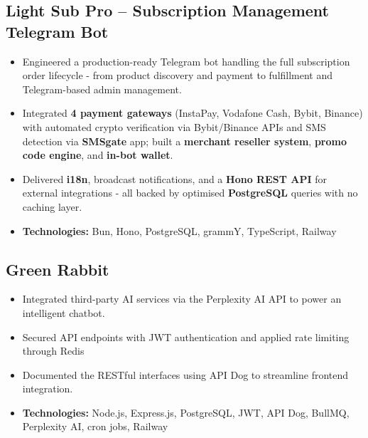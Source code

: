 \documentclass[11pt,a4paper]{article}
\begin{document}
\subsection{Light Sub Pro -- Subscription Management Telegram Bot }
    \begin{itemize}
        \item Engineered a production-ready Telegram bot handling the full subscription order lifecycle - from product discovery and payment to fulfillment and Telegram-based admin management.
        \item Integrated \textbf{4 payment gateways} (InstaPay, Vodafone Cash, Bybit, Binance) with automated crypto verification via Bybit/Binance APIs and SMS detection via \textbf{SMSgate} app; built a \textbf{merchant reseller system}, \textbf{promo code engine}, and \textbf{in-bot wallet}.
        \item Delivered \textbf{i18n}, broadcast notifications, and a \textbf{Hono REST API} for external integrations - all backed by optimised \textbf{PostgreSQL} queries with no caching layer.
        \item \textbf{Technologies:} Bun, Hono, PostgreSQL, grammY, TypeScript, Railway
    \end{itemize}

\subsection{Green Rabbit}
    \begin{itemize}
        \item Integrated third-party AI services via the Perplexity AI API to power an intelligent chatbot.
        \item Secured API endpoints with JWT authentication and applied rate limiting through Redis
        \item Documented the RESTful interfaces using API Dog to streamline frontend integration.
    \item \textbf{Technologies:} Node.js, Express.js, PostgreSQL, JWT, API Dog, BullMQ, Perplexity AI, cron jobs, Railway
    \end{itemize}
\end{document}
